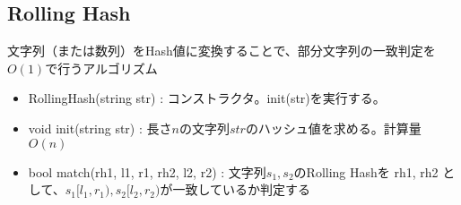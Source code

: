 \subsection{Rolling Hash}

文字列（または数列）をHash値に変換することで、部分文字列の一致判定を$O(1)$で行うアルゴリズム

\begin{itemize}
    \item RollingHash(string str) : コンストラクタ。init(str)を実行する。
    \item void init(string str) : 長さ$n$の文字列$str$のハッシュ値を求める。計算量$O(n)$
    \item bool match(rh1, l1, r1, rh2, l2, r2) : 文字列$s_1,s_2$のRolling Hashを rh1, rh2 として、$s_1[l_1,r_1), s_2[l_2,r_2)$が一致しているか判定する
\end{itemize}

